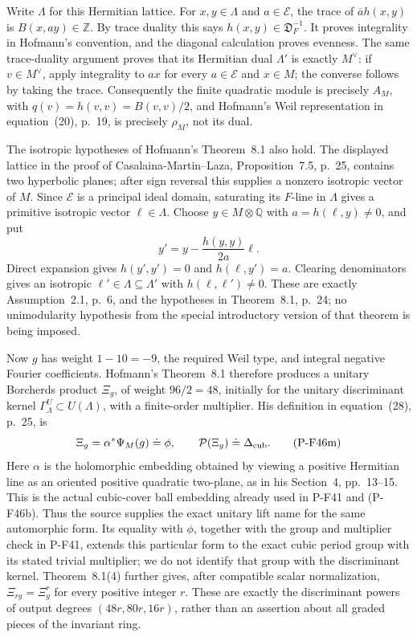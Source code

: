 \documentclass[11pt,a4paper]{article}
\begin{document}
Write $\Lambda$ for this Hermitian lattice. For
$x,y\in\Lambda$ and $a\in\mathcal E$, the trace
of $\overline a h(x,y)$ is $B(x,ay)\in\mathbb Z$.
By trace duality this says
$h(x,y)\in\mathfrak D_F^{-1}$. It proves integrality
in Hofmann's convention, and the diagonal calculation
proves evenness. The same trace-duality argument proves
that its Hermitian dual $\Lambda'$ is exactly $M^\vee$:
if $v\in M^\vee$, apply integrality to $ax$ for every
$a\in\mathcal E$ and $x\in M$; the converse follows
by taking the trace. Consequently the finite quadratic
module is precisely $A_M$, with
$q(v)=h(v,v)=B(v,v)/2$, and Hofmann's Weil
representation in equation~(20), p.~19, is precisely
$\rho_M$, not its dual.

The isotropic hypotheses of Hofmann's Theorem~8.1
also hold. The displayed lattice in the proof of
Casalaina-Martin--Laza, Proposition~7.5, p.~25,
contains two hyperbolic planes; after sign reversal
this supplies a nonzero isotropic vector of $M$.
Since $\mathcal E$ is a principal ideal domain,
saturating its $F$-line in $\Lambda$ gives a primitive
isotropic vector $\ell\in\Lambda$.
Choose $y\in M\otimes\mathbb Q$ with
$a=h(\ell,y)\ne0$, and put
\[
              y'=y-\frac{h(y,y)}{2a}\ell.
\]
Direct expansion gives $h(y',y')=0$ and
$h(\ell,y')=a$. Clearing denominators gives an
isotropic $\ell'\in\Lambda\subseteq\Lambda'$ with
$h(\ell,\ell')\ne0$. These are exactly Assumption~2.1,
p.~6, and the hypotheses in Theorem~8.1, p.~24;
no unimodularity hypothesis from the special introductory
version of that theorem is being imposed.

Now $g$ has weight $1-10=-9$, the required Weil type,
and integral negative Fourier coefficients. Hofmann's
Theorem~8.1 therefore produces a unitary Borcherds
product $\Xi_g$, of weight $96/2=48$, initially for
the unitary discriminant kernel
$\Gamma^U_\Lambda\subset U(\Lambda)$, with a
finite-order multiplier. His definition in
equation~(28), p.~25, is
\[
        \Xi_g=\alpha^*\Psi_M(g)\doteq\phi,
        \qquad \mathcal P(\Xi_g)\doteq\Delta_{\rm cub}.
 \tag{P-F46m}
\]
Here $\alpha$ is the holomorphic embedding obtained
by viewing a positive Hermitian line as an oriented
positive quadratic two-plane, as in his Section~4,
pp.~13--15. This is the actual cubic-cover ball
embedding already used in P-F41 and (P-F46b).
Thus the source supplies the exact unitary lift name
for the same automorphic form. Its equality with
$\phi$, together with the group and multiplier check
in P-F41, extends this particular form to the exact
cubic period group with its stated trivial multiplier;
we do not identify that group with the discriminant
kernel. Theorem~8.1(4) further gives, after compatible
scalar normalization,
$\Xi_{r g}=\Xi_g^r$ for every positive integer $r$.
These are exactly the discriminant powers of output
degrees $(48r,80r,16r)$, rather than an assertion about
all graded pieces of the invariant ring.
\end{document}
